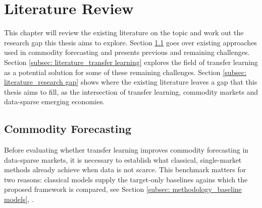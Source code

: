 
\section{Literature Review} \label{sec: literature review}
This chapter will review the existing literature on the topic and work out the research gap this thesis aims to explore. Section \ref{subsec: literature_commodity forecasting} goes over existing approaches used in commodity forecasting and presents previous and remaining challenges. Section \ref{subsec: literature_transfer learning} explores the field of transfer learning as a potential solution for some of these remaining challenges. Section \ref{subsec: literature_research gap} shows where the existing literature leaves a gap that this thesis aims to fill, as the intersection of transfer learning, commodity markets and data-sparse emerging economies.

\subsection{Commodity Forecasting}  \label{subsec: literature_commodity forecasting}
Before evaluating whether transfer learning improves commodity forecasting in data-sparse markets, it is necessary to establish what classical, single-market methods already achieve when data is not scarce. This benchmark matters for two reasons: classical models supply the target-only baselines agains which the proposed framework is compared, see Section \ref{subsec: methodology_baseline models}, .

